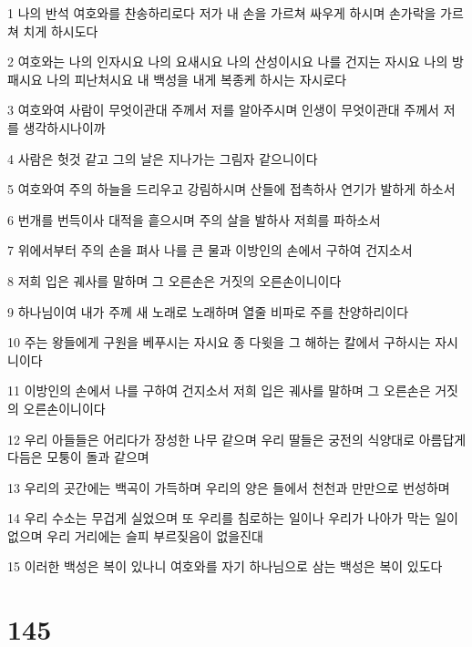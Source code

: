 \par 1 나의 반석 여호와를 찬송하리로다 저가 내 손을 가르쳐 싸우게 하시며 손가락을 가르쳐 치게 하시도다
\par 2 여호와는 나의 인자시요 나의 요새시요 나의 산성이시요 나를 건지는 자시요 나의 방패시요 나의 피난처시요 내 백성을 내게 복종케 하시는 자시로다
\par 3 여호와여 사람이 무엇이관대 주께서 저를 알아주시며 인생이 무엇이관대 주께서 저를 생각하시나이까
\par 4 사람은 헛것 같고 그의 날은 지나가는 그림자 같으니이다
\par 5 여호와여 주의 하늘을 드리우고 강림하시며 산들에 접촉하사 연기가 발하게 하소서
\par 6 번개를 번득이사 대적을 흩으시며 주의 살을 발하사 저희를 파하소서
\par 7 위에서부터 주의 손을 펴사 나를 큰 물과 이방인의 손에서 구하여 건지소서
\par 8 저희 입은 궤사를 말하며 그 오른손은 거짓의 오른손이니이다
\par 9 하나님이여 내가 주께 새 노래로 노래하며 열줄 비파로 주를 찬양하리이다
\par 10 주는 왕들에게 구원을 베푸시는 자시요 종 다윗을 그 해하는 칼에서 구하시는 자시니이다
\par 11 이방인의 손에서 나를 구하여 건지소서 저희 입은 궤사를 말하며 그 오른손은 거짓의 오른손이니이다
\par 12 우리 아들들은 어리다가 장성한 나무 같으며 우리 딸들은 궁전의 식양대로 아름답게 다듬은 모퉁이 돌과 같으며
\par 13 우리의 곳간에는 백곡이 가득하며 우리의 양은 들에서 천천과 만만으로 번성하며
\par 14 우리 수소는 무겁게 실었으며 또 우리를 침로하는 일이나 우리가 나아가 막는 일이 없으며 우리 거리에는 슬피 부르짖음이 없을진대
\par 15 이러한 백성은 복이 있나니 여호와를 자기 하나님으로 삼는 백성은 복이 있도다

\chapter{145}

